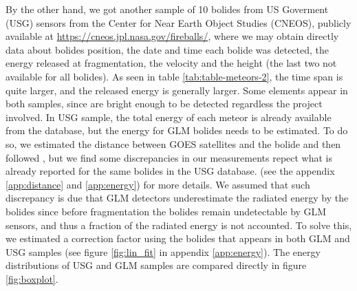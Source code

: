 By the other hand, we got another sample of 10 bolides from US Goverment (USG) sensors from the Center for Near Earth Object Studies (CNEOS), publicly available at \url{https://cneos.jpl.nasa.gov/fireballs/}, where we may obtain directly data about bolides position, the date and time each bolide was detected, the energy released at fragmentation, the velocity and the height (the last two not available for all bolides). As seen in table \ref{tab:table-meteors-2}, the time span is quite larger, and the released energy is generally larger. Some elements appear in both samples, since are bright enough to be detected regardless the project involved. In USG sample, the total energy of each meteor is already available from the database, but the energy for GLM bolides needs to be estimated. To do so, we estimated the distance between GOES satellites and the bolide and then followed \citet{Jenniskens:2018}, but we find some discrepancies in our measurements repect what is already reported for the same bolides in the USG database. (see the appendix \ref{app:distance} and \ref{app:energy}) for more details. We assumed that such discrepancy is due that GLM detectors underestimate the radiated energy by the bolides since before fragmentation the bolides remain undetectable by GLM sensors, and thus a fraction of the radiated energy is not accounted. To solve this, we estimated a correction factor using the bolides that appears in both GLM and USG samples (see figure \ref{fig:lin_fit} in appendix \ref{app:energy}). The energy distributions of USG and GLM samples are compared directly in figure \ref{fig:boxplot}. 

